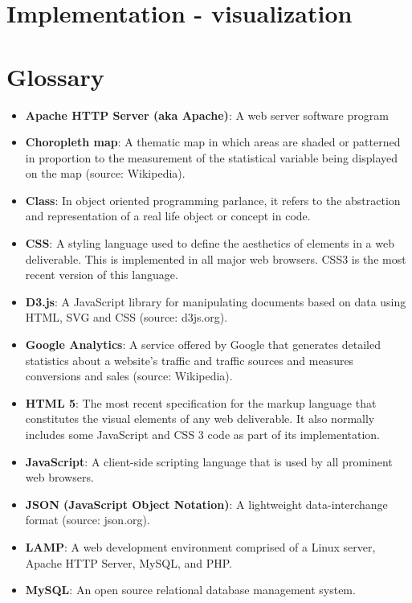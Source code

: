 \documentclass[12pt]{article}
\begin{document}
\vfill

\section{Implementation - visualization}

\vfill

\section{Glossary}
\begin{itemize}
\item[] \textbf{Apache HTTP Server (aka Apache)}: A web server software program
\item[] \textbf{Choropleth map}: A thematic map in which areas are shaded or patterned in proportion to the measurement of the statistical variable being displayed on the map (source: Wikipedia).
\item[] \textbf{Class}: In object oriented programming parlance, it refers to the abstraction and representation of a real life object or concept in code.
\item[] \textbf{CSS}: A styling language used to define the aesthetics of elements in a web deliverable. This is implemented in all major web browsers. CSS3 is the most recent version of this language.
\item[] \textbf{D3.js}: A JavaScript library for manipulating documents based on data using HTML, SVG and CSS (source: d3js.org).
\item[] \textbf{Google Analytics}: A service offered by Google that generates detailed statistics about a website's traffic and traffic sources and measures conversions and sales (source: Wikipedia).
\item[] \textbf{HTML 5}: The most recent specification for the markup language that constitutes the visual elements of any web deliverable. It also normally includes some JavaScript and CSS 3 code as part of its implementation.
\item[] \textbf{JavaScript}: A client-side scripting language that is used by all prominent web browsers.
\item[] \textbf{JSON (JavaScript Object Notation)}: A lightweight data-interchange format (source: json.org).
\item[] \textbf{LAMP}: A web development environment comprised of a Linux server, Apache HTTP Server, MySQL, and PHP.
\item[] \textbf{MySQL}: An open source relational database management system.

\end{itemize}
\end{document}
